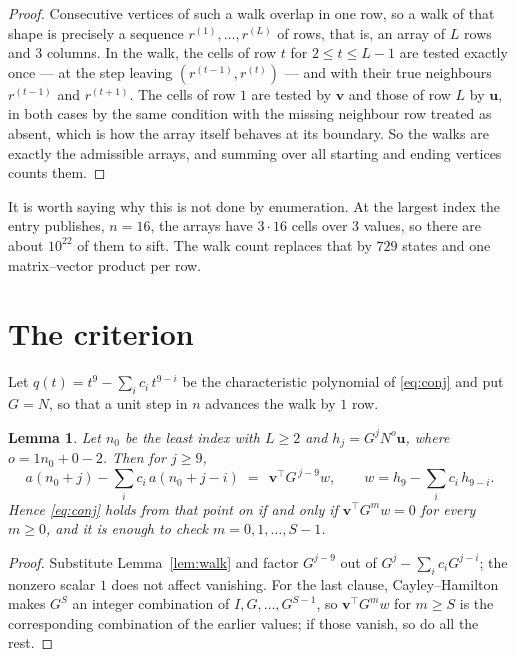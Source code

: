 \documentclass[11pt,a4paper]{article}
\theoremstyle{plain}
\newtheorem{lemma}[theorem]{Lemma}
\theoremstyle{definition}
\begin{document}
\begin{proof}
Consecutive vertices of such a walk overlap in one row, so a walk of that shape is
precisely a sequence $r^{(1)},\dots,r^{(L)}$ of rows, that is, an array of $L$ rows
and $3$ columns. In the walk, the cells of row $t$ for $2\le t\le L-1$ are tested
exactly once --- at the step leaving $(r^{(t-1)},r^{(t)})$ --- and with their true
neighbours $r^{(t-1)}$ and $r^{(t+1)}$. The cells of row $1$ are tested by
$\mathbf{v}$ and those of row $L$ by $\mathbf{u}$, in both cases by the same condition
with the missing neighbour row treated as absent, which is how the array itself behaves at
its boundary. So the walks are exactly the admissible arrays, and summing over all starting
and ending vertices counts them.
\end{proof}


It is worth saying why this is not done by enumeration. At the largest index the entry
publishes, $n=16$, the arrays have $3\cdot16$ cells over
$3$ values, so there are about $10^{22}$ of them to sift. The
walk count replaces that by $729$ states and one matrix--vector product per row.
\section{The criterion}

Let $q(t)=t^{9}-\sum_i c_i\,t^{9-i}$ be the characteristic polynomial of
\eqref{eq:conj} and put $G=N$, so that a unit step in $n$ advances the walk by
$1$ row.

\begin{lemma}\label{lem:crit}
Let $n_0$ be the least index with $L\ge2$ and $h_j=G^{j}N^{o}\mathbf{u}$, where
$o=1n_0+0-2$. Then for $j\ge9$,
\[
a(n_0+j)-\sum_i c_i\,a(n_0+j-i)\;=\;\,\mathbf{v}^{\!\top}G^{\,j-9}w,
\qquad w=h_{9}-\sum_i c_i\,h_{9-i} .
\]
Hence \eqref{eq:conj} holds from that point on if and only if
$\mathbf{v}^{\!\top}G^{m}w=0$ for every $m\ge0$, and it is enough to check
$m=0,1,\dots,S-1$.
\end{lemma}

\begin{proof}
Substitute Lemma~\ref{lem:walk} and factor $G^{j-9}$ out of
$G^{j}-\sum_ic_iG^{j-i}$; the nonzero scalar $1$ does not affect
vanishing. For the last clause, Cayley--Hamilton makes $G^{S}$ an integer combination of
$I,G,\dots,G^{S-1}$, so $\mathbf{v}^{\!\top}G^{m}w$ for $m\ge S$ is the corresponding
combination of the earlier values; if those vanish, so do all the rest.
\end{proof}
\end{document}
